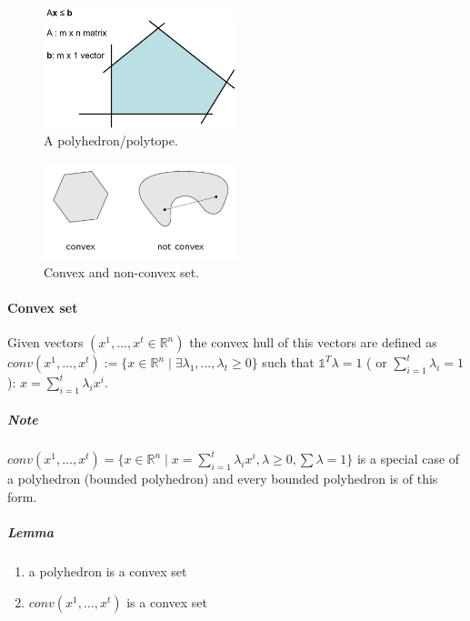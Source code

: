 \documentclass[main]{subfiles}
\begin{document}
\begin{figure}
  \label{fig:polyhedron}
  \caption{A polyhedron/polytope.}
  \centering
    \includegraphics[width=0.5\textwidth]{imgs/polyhedron.png}
\end{figure}

\begin{figure}
  \label{fig:convex-set}
  \caption{Convex and non-convex set.}
  \centering
    \includegraphics[width=0.5\textwidth]{imgs/convex-set.png}
\end{figure}


\paragraph{Convex set}
Given vectors $(x^{1}, \dots, x^{t} \in \mathbb{R}^{n})$ the convex hull of
this vectors are defined as $conv(x^{1}, \dots, x^{t}):= \{ x \in
\mathbb{R}^{n} \mid \exists \lambda_{1}, \dots, \lambda_{t} \geq 0 \}$ such
that $\mathds{1}^{T} \lambda = 1$ ( or $\sum_{i=1}^{t} \lambda_{i} = 1$):
$x = \sum_{i=1}^{t} \lambda_{i} x^{i}$.

\subparagraph{Note}
$conv(x^{1}, \dots, x^{t}) = \{ x \in \mathbb{R}^{n} \mid x = \sum_{i=1}^{t}
\lambda_{i} x^{i}, \lambda \geq 0, \sum \lambda = 1 \}$ is a special case of a
polyhedron (bounded polyhedron) and every bounded polyhedron is of this form.

\subparagraph{Lemma}
\begin{enumerate}
\item \label{item:polyhedron-convex-set} a polyhedron is a convex set
\item \label{item:convex-hull-convex-set} $conv(x^{1}, \dots, x^{t})$ is a convex set
\end{enumerate}
\end{document}
